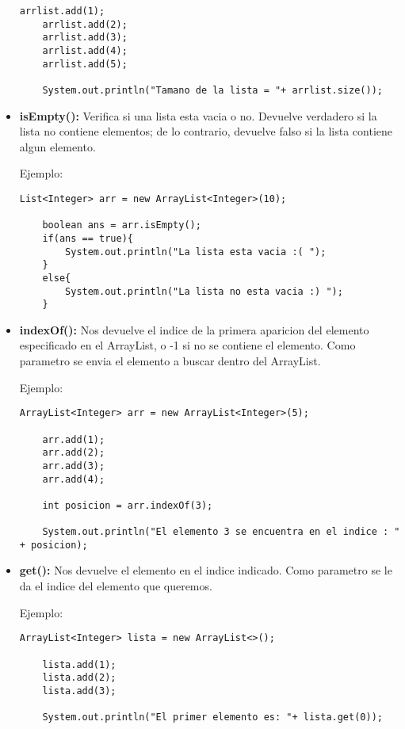 \documentclass[12pt, letterpaper]{article} %
\begin{document}
\begin{itemize}
\begin{lstlisting}[frame=single]
    arrlist.add(1);
    arrlist.add(2);
    arrlist.add(3);
    arrlist.add(4);
    arrlist.add(5);

    System.out.println("Tamano de la lista = "+ arrlist.size());
    \end{lstlisting}
    
    \item \textbf{isEmpty():} Verifica si una lista esta vacia o no. Devuelve verdadero si la lista no contiene elementos; de lo contrario, devuelve falso si la lista contiene algun elemento.
    
    Ejemplo:
    \lstset{language = Java, breaklines=true, basicstyle=\footnotesize}
    \begin{lstlisting}[frame=single]
    List<Integer> arr = new ArrayList<Integer>(10);
    
    boolean ans = arr.isEmpty();
    if(ans == true){
        System.out.println("La lista esta vacia :( ");
    }
    else{
    	System.out.println("La lista no esta vacia :) ");
    }
    \end{lstlisting}

    \item \textbf{indexOf():} Nos devuelve el indice de la primera aparicion del elemento especificado en el ArrayList, o -1 si no se contiene el elemento. Como parametro se envia el elemento a buscar dentro del ArrayList.
    
    Ejemplo:
    \lstset{language = Java, breaklines=true, basicstyle=\footnotesize}
    \begin{lstlisting}[frame=single]
    ArrayList<Integer> arr = new ArrayList<Integer>(5);

    arr.add(1);
    arr.add(2);
    arr.add(3);
    arr.add(4);

    int posicion = arr.indexOf(3);

    System.out.println("El elemento 3 se encuentra en el indice : " + posicion);
    \end{lstlisting}

    \item \textbf{get():} Nos devuelve el elemento en el indice indicado. Como parametro se le da el indice del elemento que queremos.
    
    Ejemplo:
    \lstset{language = Java, breaklines=true, basicstyle=\footnotesize}
    \begin{lstlisting}[frame=single]
    ArrayList<Integer> lista = new ArrayList<>();

    lista.add(1);
    lista.add(2);
    lista.add(3);

    System.out.println("El primer elemento es: "+ lista.get(0));
    \end{lstlisting}
\end{itemize}
\end{document}
